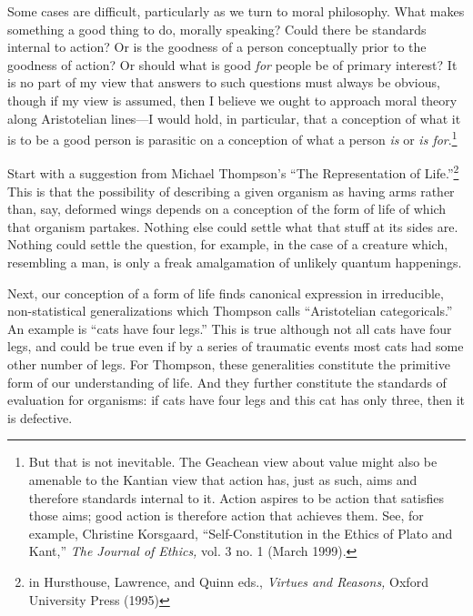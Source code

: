 \documentclass[11pt]{amsart}
\begin{document}
Some cases are difficult, particularly as we turn to moral philosophy. What makes something a good thing to do, morally speaking? Could there be standards internal to action? Or is the goodness of a person conceptually prior to the goodness of action? Or should what is good \emph{for} people be of primary interest? It is no part of my view that answers to such questions must always be obvious, though if my view is assumed, then I believe we ought to approach moral theory along Aristotelian lines---I would hold, in particular, that a conception of what it is to be a good person is parasitic on a conception of what a person \emph{is} or \emph{is for}.\footnote{But that is not inevitable. The Geachean view about value might also be amenable to the Kantian view that action has, just as such, aims and therefore standards internal to it. Action aspires to be action that satisfies those aims; good action is therefore action that achieves them. See, for example, Christine Korsgaard, ``Self-Constitution in the Ethics of Plato and Kant,'' \emph{The Journal of Ethics,} vol. 3 no. 1 (March 1999).}




Start with a suggestion from Michael Thompson's ``The Representation of Life.''\footnote{in Hursthouse, Lawrence, and Quinn eds., \emph{Virtues and Reasons,} Oxford University Press (1995)} This is that the possibility of describing a given organism as having arms rather than, say, deformed wings depends on a conception of the form of life of which that organism partakes. Nothing else could settle what that stuff at its sides are. Nothing could settle the question, for example, in the case of a creature which, resembling a man, is only a freak amalgamation of unlikely quantum happenings.

Next, our conception of a form of life finds canonical expression in irreducible, non-statistical generalizations which Thompson calls ``Aristotelian categoricals.'' An example is ``cats have four legs.'' This is true although not all cats have four legs, and could be true even if by a series of traumatic events most cats had some other number of legs. For Thompson, these generalities constitute the primitive form of our understanding of life. And they further constitute the standards of evaluation for organisms: if cats have four legs and this cat has only three, then it is defective.
\end{document}
